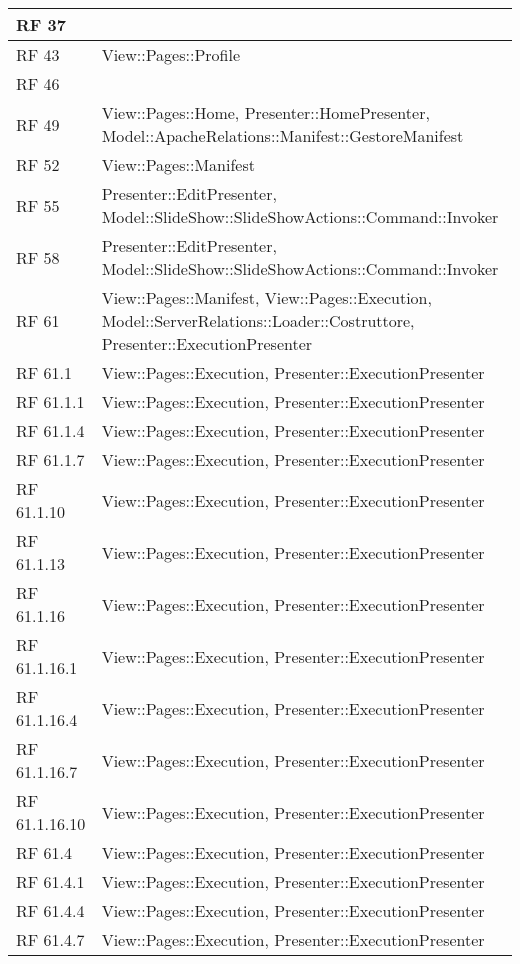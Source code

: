 {\begin{longtable} [c]{| p{2cm} | p{13cm} |}
 \hline 
RF 37 & \\ 
 \hline 
RF 43 & View::Pages::Profile\\ 
 \hline 
RF 46 & \\ 
 \hline 
RF 49 & View::Pages::Home, Presenter::HomePresenter, Model::ApacheRelations::Manifest::GestoreManifest\\ 
 \hline 
RF 52 & View::Pages::Manifest\\ 
 \hline 
RF 55 & Presenter::EditPresenter, Model::SlideShow::SlideShowActions::Command::Invoker\\ 
 \hline 
RF 58 & Presenter::EditPresenter, Model::SlideShow::SlideShowActions::Command::Invoker\\ 
 \hline 
RF 61 & View::Pages::Manifest, View::Pages::Execution, Model::ServerRelations::Loader::Costruttore, Presenter::ExecutionPresenter\\ 
 \hline 
RF 61.1 & View::Pages::Execution, Presenter::ExecutionPresenter\\ 
 \hline 
RF 61.1.1 & View::Pages::Execution, Presenter::ExecutionPresenter\\ 
 \hline 
RF 61.1.4 & View::Pages::Execution, Presenter::ExecutionPresenter\\ 
 \hline 
RF 61.1.7 & View::Pages::Execution, Presenter::ExecutionPresenter\\ 
 \hline 
RF 61.1.10 & View::Pages::Execution, Presenter::ExecutionPresenter\\ 
 \hline 
RF 61.1.13 & View::Pages::Execution, Presenter::ExecutionPresenter\\ 
 \hline 
RF 61.1.16 & View::Pages::Execution, Presenter::ExecutionPresenter\\ 
 \hline 
RF 61.1.16.1 & View::Pages::Execution, Presenter::ExecutionPresenter\\ 
 \hline 
RF 61.1.16.4 & View::Pages::Execution, Presenter::ExecutionPresenter\\ 
 \hline 
RF 61.1.16.7 & View::Pages::Execution, Presenter::ExecutionPresenter\\ 
 \hline 
RF 61.1.16.10 & View::Pages::Execution, Presenter::ExecutionPresenter\\ 
 \hline 
RF 61.4 & View::Pages::Execution, Presenter::ExecutionPresenter\\ 
 \hline 
RF 61.4.1 & View::Pages::Execution, Presenter::ExecutionPresenter\\ 
 \hline 
RF 61.4.4 & View::Pages::Execution, Presenter::ExecutionPresenter\\ 
 \hline 
RF 61.4.7 & View::Pages::Execution, Presenter::ExecutionPresenter\\ 

\end{longtable}}
